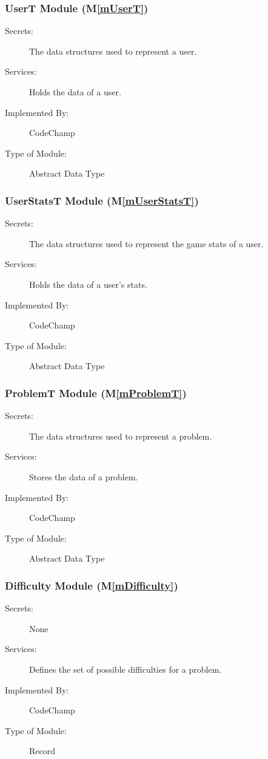 \documentclass[12pt, titlepage]{article}
\newcommand{\mref}[1]{M\ref{#1}}
\begin{document}
\subsubsection{ UserT Module (\mref{mUserT})}

\begin{description}
\item[Secrets:] The data structures used to represent a user.
\item[Services:] Holds the data of a user.
\item[Implemented By:] CodeChamp
\item[Type of Module:] Abstract Data Type
\end{description}

\subsubsection{ UserStatsT Module (\mref{mUserStatsT})}

\begin{description}
\item[Secrets:] The data structures used to represent the game stats of a user.
\item[Services:] Holds the data of a user's stats.
\item[Implemented By:] CodeChamp
\item[Type of Module:] Abstract Data Type
\end{description}

\subsubsection{ ProblemT Module (\mref{mProblemT})}

\begin{description}
\item[Secrets:] The data structures used to represent a problem.
\item[Services:] Stores the data of a problem.
\item[Implemented By:] CodeChamp
\item[Type of Module:] Abstract Data Type
\end{description}

\subsubsection{ Difficulty Module (\mref{mDifficulty})}

\begin{description}
\item[Secrets:] None
\item[Services:] Defines the set of possible difficulties for a problem.
\item[Implemented By:] CodeChamp
\item[Type of Module:] Record
\end{description}
\end{document}
